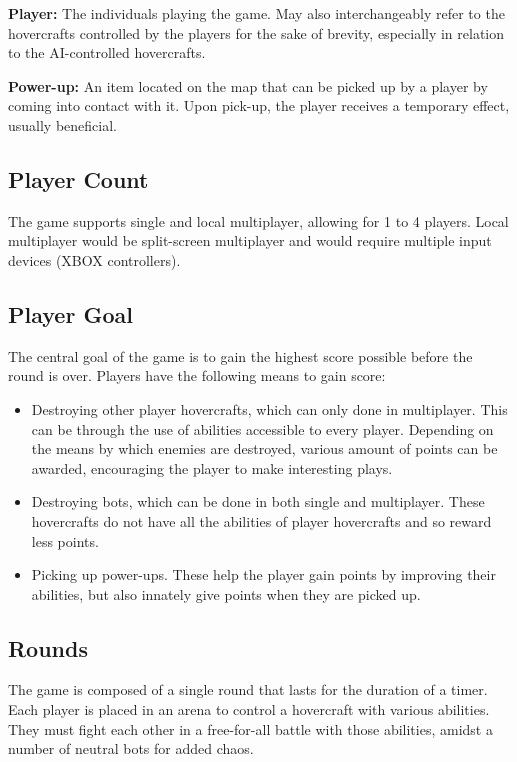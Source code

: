 \documentclass{article}
\theoremstyle{definition}
\begin{document}
\textbf{Player:} The individuals playing the game. May also interchangeably
refer to the hovercrafts controlled by the players for the sake of brevity,
especially in relation to the AI-controlled hovercrafts.

\textbf{Power-up:} An item located on the map that can be picked up by a player
by coming into contact with it. Upon pick-up, the player receives a temporary
effect, usually beneficial.

\subsection{Player Count}

The game supports single and local multiplayer, allowing for 1 to 4 players.
Local multiplayer would be split-screen multiplayer and would require multiple
input devices (XBOX controllers).

\subsection{Player Goal}

The central goal of the game is to gain the highest score possible before the
round is over. Players have the following means to gain score:
\begin{itemize}
  \item Destroying other player hovercrafts, which can only done in
    multiplayer. This can be through the use of abilities accessible to every
    player. Depending on the means by which enemies are destroyed, various
    amount of points can be awarded, encouraging the player to make interesting
    plays.
  \item Destroying bots, which can be done in both single and multiplayer.
    These hovercrafts do not have all the abilities of player hovercrafts and
    so reward less points.
  \item Picking up power-ups. These help the player gain points by improving
    their abilities, but also innately give points when they are picked up.
\end{itemize}

\subsection{Rounds}

The game is composed of a single round that lasts for the duration of a timer.
Each player is placed in an arena to control a hovercraft with various
abilities. They must fight each other in a free-for-all battle with those
abilities, amidst a number of neutral bots for added chaos.
\end{document}
